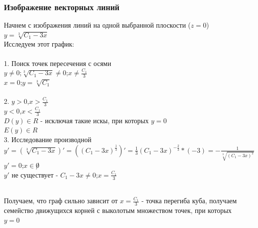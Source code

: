 \documentclass{article}
\begin{document}
            \subsubsection{Изображение векторных линий}
                Начнем с изображения линий на одной выбранной плоскости ($z = 0$)\\
                $y = \sqrt[3]{C_1 - 3x}$\\
                Исследуем этот график:\\\\
                1. Поиск точек пересечения с осями\\
                $y \not = 0$;\space $\sqrt[3]{C_1 - 3x} \not = 0$;\space $x \not = \frac{C_1}{3}$\\
                $x = 0$;\space $y = \sqrt[3]{C_1}$\\\\
                2. $y > 0$,\space $x > \frac{C_1}{3}$\\ 
                $y < 0$,\space $x < \frac{C_1}{3}$\\
                $D(y) \in R$ - исключая такие искы, при которых $y = 0$\\
                $E(y) \in R$\\
                3. Исследование производной\\
                $y' = (\sqrt[3]{C_1 - 3x})' = ((C_1 - 3x)^{\frac{1}{3}})' = \frac{1}{3}(C_1 - 3x)^{-\frac{2}{3}} * (-3) = -\frac{1}{\sqrt[3]{(C_1 - 3x)^2}}$\\
                $y' = 0$;\space $x \in \not 0$\\
                $y'$ не существует - $C_1 - 3x \not = 0$;\space $x = \frac{C_1}{3}$\\
                \begin{figure}[h!]
                \end{figure}\\
                Получаем, что граф сильно зависит от $x = \frac{C_1}{3}$ - точка перегиба куба, получаем семейство движущихся корней с выколотым множеством точек, при которых $y = 0$\\
\end{document}
